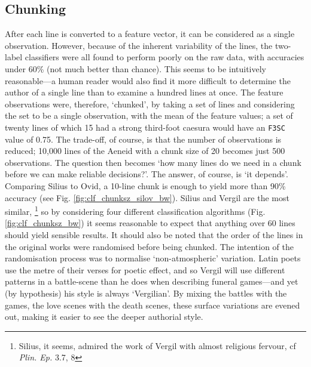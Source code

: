 \documentclass[11pt,a4paper]{scrartcl} %
\begin{document}
{\subsection{Chunking}

After each line is converted to a feature vector, it can be considered as a single observation. However, because of the inherent variability of the lines, the two-label classifiers were all found to perform poorly on the raw data, with accuracies under 60\% (not much better than chance). This seems to be intuitively reasonable---a human reader would also find it more difficult to determine the author of a single line than to examine a hundred lines at once. The feature observations were, therefore, `chunked', by taking a set of lines and considering the set to be a single observation, with the mean of the feature values; a set of twenty lines of which 15 had a strong third-foot caesura would have an \texttt{F3SC} value of 0.75. The trade-off, of course, is that the number of observations is reduced; 10,000 lines of the Aeneid with a chunk size of 20 becomes just 500 observations. The question then becomes `how many lines do we need in a chunk before we can make reliable decisions?'. The answer, of course, is `it depends'. Comparing Silius to Ovid, a 10-line chunk is enough to yield more than 90\% accuracy (see Fig. \ref{fig:clf_chunksz_silov_bw}). Silius and Vergil are the most similar,%
\footnote{Silius, it seems, admired the work of Vergil with almost religious fervour, cf \textit{Plin. Ep.} 3.7, 8}
so by considering four different classification algorithms (Fig. \ref{fig:clf_chunksz_bw}) it seems reasonable to expect that anything over 60 lines should yield sensible results. It should also be noted that the order of the lines in the original works were randomised before being chunked. The intention of the randomisation process was to normalise `non-atmospheric' variation. Latin poets use the metre of their verses for poetic effect, and so Vergil will use different patterns in a battle-scene than he does when describing funeral games---and yet (by hypothesis) his style is always `Vergilian'. By mixing the battles with the games, the love scenes with the death scenes, these surface variations are evened out, making it easier to see the deeper authorial style.

}
\end{document}
